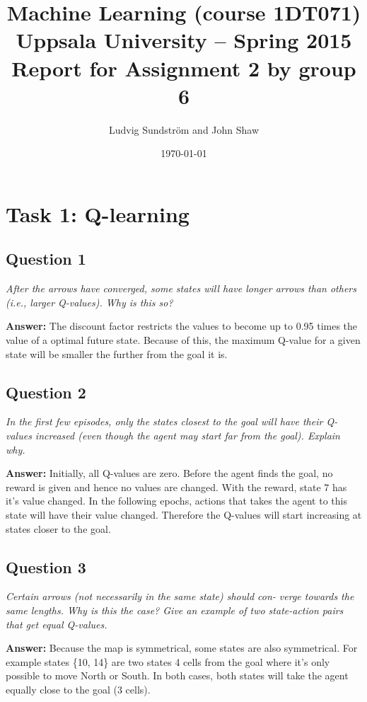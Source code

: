 \documentclass[a4paper]{article}
\title{Machine Learning (course 1DT071)
Uppsala University – Spring 2015
Report for Assignment 2 by group 6}
\author{Ludvig Sundstr\"{o}m and John Shaw}
\date{\today}
\begin{document}
\maketitle

\section{Task 1: Q-learning}

\subsection*{Question 1}
\emph{After the arrows have converged, some states will have longer
arrows than others (i.e., larger Q-values). Why is this so?}

\textbf{Answer:} The discount factor restricts the values to become up to 0.95 times the value of a optimal future state. Because of this, the maximum Q-value for a given state will be smaller the further from the goal it is. 

\subsection*{Question 2}
\emph{In the first few episodes, only the states closest to the goal will
have their Q-values increased (even though the agent may start far from the
goal). Explain why.}

\textbf{Answer:} Initially, all Q-values are zero. Before the agent finds the goal, no reward is given and hence no values are changed. With the reward, state 7 has it's value changed. In the following epochs, actions that takes the agent to this state will have their value changed. Therefore the Q-values will start increasing at states closer to the goal.

\pagebreak
\subsection*{Question 3}
\emph{Certain arrows (not necessarily in the same state) should con-
verge towards the same lengths. Why is this the case? Give an example of two
state-action pairs that get equal Q-values.}


\textbf{Answer:} Because the map is symmetrical, some states are also symmetrical. For example states \{10, 14\} are two states 4 cells from the goal where it's only possible to move North or South. In both cases, both states will take the agent equally close to the goal (3 cells). 
\end{document}

